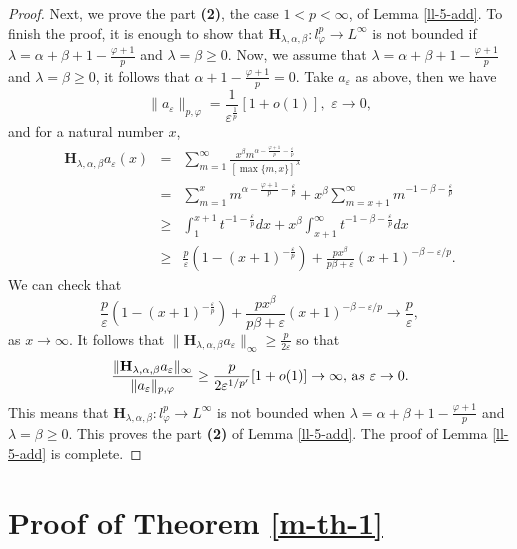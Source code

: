 \documentclass[10pt]{amsart}
\theoremstyle{definition}    %
\numberwithin{equation}{section}
\begin{document}
\begin{proof}
Next, we prove the part {\bf (2)}, the case $1<p<\infty$, of Lemma \ref{ll-5-add}.  
To finish the proof, it is enough to show that $\mathbf{H}_{\lambda, \alpha, \beta}: l_{\varphi}^p \rightarrow L^{\infty}$ is not bounded if $\lambda=\alpha+\beta+1-\frac{\varphi+1}{p}$ and $\lambda=\beta\geq 0$. Now, we assume that
$\lambda=\alpha+\beta+1-\frac{\varphi+1}{p}$ and $\lambda=\beta\geq 0$, it follows that $\alpha+1-\frac{\varphi+1}{p}=0$.  Take $a_{\varepsilon}$ as above, then we have 
$$\|a_{\varepsilon}\|_{p, \varphi}=\frac{1}{{\varepsilon}^{\frac{1}{p}}}[1+o(1)],\,\, \varepsilon \rightarrow 0,$$ 
and for a natural number $x$,
 \begin{eqnarray}
\mathbf{H}_{\lambda, \alpha, \beta}a_{\varepsilon}(x)&=&\sum_{m=1}^{\infty}\frac{x^{\beta}m^{\alpha-\frac{\varphi+1}{p}-\frac{\varepsilon}{p}}}{[\max\{m,x\}]^{\lambda}}
\nonumber \\
&=&\sum_{m=1}^{x}m^{\alpha-\frac{\varphi+1}{p}-\frac{\varepsilon}{p}}+x^{\beta}\sum_{m=x+1}^{\infty}m^{-1-\beta-\frac{\varepsilon}{p}}
\nonumber \\
&\geq & \int_{1}^{x+1}t^{-1-\frac{\varepsilon}{p}}dx+x^{\beta}\int_{x+1}^{\infty}t^{-1-\beta-\frac{\varepsilon}{p}}dx\nonumber \\
&\geq & \frac{p}{\varepsilon}(1-(x+1)^{-\frac{\varepsilon}{p}})+\frac{px^{\beta}}{p\beta+\varepsilon}(x+1)^{-\beta-\varepsilon/p}.\nonumber 
\end{eqnarray} 
We can check that
$$\frac{p}{\varepsilon}(1-(x+1)^{-\frac{\varepsilon}{p}})+\frac{px^{\beta}}{p\beta+\varepsilon}(x+1)^{-\beta-\varepsilon/p}\to \frac{p}{\varepsilon},$$
as $x\to \infty$.  
It follows that $\|\mathbf{H}_{\lambda, \alpha, \beta}a_{\varepsilon}\|_{\infty}\geq \frac{p}{2\varepsilon}$ so that
\[\frac{\|\mathbf{H}_{\lambda, \alpha, \beta}a_{\varepsilon}\|_{\infty}}{\|a_{\varepsilon}\|_{p,\varphi}}\geq \frac{p}{2{\varepsilon}^{1/p'}}[1+o(1)]\to \infty,\,{\text as}\,\,\varepsilon \rightarrow 0.\]
This means that $\mathbf{H}_{\lambda, \alpha, \beta}: l_{\varphi}^p \rightarrow L^{\infty}$ is not bounded when $\lambda=\alpha+\beta+1-\frac{\varphi+1}{p}$ and $\lambda=\beta\geq 0$. This proves the part {\bf (2)} of Lemma \ref{ll-5-add}. The proof of Lemma \ref{ll-5-add} is complete. 
\end{proof}


\section{{\bf Proof of Theorem \ref{m-th-1}}}
\end{document}
